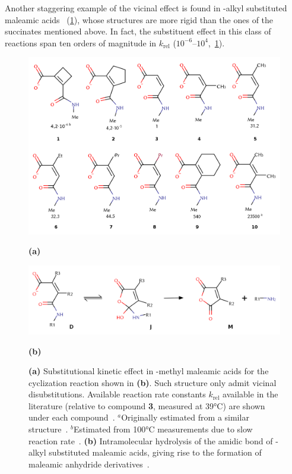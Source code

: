 Another staggering example of the vicinal effect is found in
-alkyl substituted maleamic acids~\cite{Kirby_1972,Karaman_2011} (\cref{fig:acidos_maleamicos}),
whose structures are more rigid than the ones of the
succinates mentioned above.
In fact, the substituent effect in this class of reactions span ten
orders of magnitude in
$k_\text{rel}$ ($10^{-6}$--$10^{4}$,~\cref{fig:acidos_maleamicos}).
%
\begin{figure}[hbtp]
	\centering
	\includegraphics[width=.8\textwidth]{figures/acidos_maleamicos}

	\textbf{(a)}

	\includegraphics[width=.8\textwidth]{figures/acidos_maleamicos_reacao}

	\textbf{(b)}

	\caption[Intramolecular hydrolysis of the amidic bond in maleamic acids and
		their -methyl substitutional kinetic effect.]{
		\textbf{(a)}
		Substitutional kinetic effect in -methyl
		maleamic acids for the cyclization reaction shown in \textbf{(b)}.
		Such structure only admit vicinal disubstitutions.
		Available reaction rate constants $k_\text{rel}$ available in
		the literature (relative to compound \textbf{3}, measured at 39°C)
		are shown under each compound~\cite{Kirby_1972}.
		$^a$Originally estimated from a similar structure~\cite{Kirby_1972}.
		$^b$Estimated from 100°C measurements due to slow reaction rate~\cite{Kirby_1972}.
		\textbf{(b)}
		Intramolecular hydrolysis of the amidic bond of -alkyl
		substituted maleamic acids, giving rise to the formation of maleamic
		anhydride derivatives~\cite{Kirby_1972,Jung_2005,Karaman_2011}.}%
	\label{fig:acidos_maleamicos}
\end{figure}

